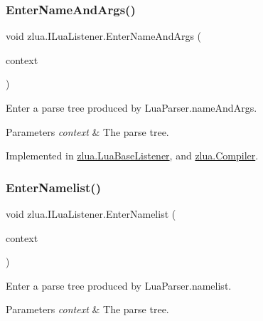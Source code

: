 \subsubsection{\texorpdfstring{Enter\+Name\+And\+Args()}{EnterNameAndArgs()}}
{\footnotesize\ttfamily void zlua.\+I\+Lua\+Listener.\+Enter\+Name\+And\+Args (\begin{DoxyParamCaption}\item[{\mbox{[}\+Not\+Null\mbox{]} \mbox{\hyperlink{classzlua_1_1_lua_parser_1_1_name_and_args_context}{Lua\+Parser.\+Name\+And\+Args\+Context}}}]{context }\end{DoxyParamCaption})}



Enter a parse tree produced by Lua\+Parser.\+name\+And\+Args. 


\begin{DoxyParams}{Parameters}
{\em context} & The parse tree.\\
\hline
\end{DoxyParams}


Implemented in \mbox{\hyperlink{classzlua_1_1_lua_base_listener_a118e7bc8edc07875df5c564171a36084}{zlua.\+Lua\+Base\+Listener}}, and \mbox{\hyperlink{classzlua_1_1_compiler_a84d43624eeeff6bf6b9f229a8880fe0a}{zlua.\+Compiler}}.

\mbox{\label{interfacezlua_1_1_i_lua_listener_ad550fd673f32ad3d88572e1781551e41}} 
\subsubsection{\texorpdfstring{Enter\+Namelist()}{EnterNamelist()}}
{\footnotesize\ttfamily void zlua.\+I\+Lua\+Listener.\+Enter\+Namelist (\begin{DoxyParamCaption}\item[{\mbox{[}\+Not\+Null\mbox{]} \mbox{\hyperlink{classzlua_1_1_lua_parser_1_1_namelist_context}{Lua\+Parser.\+Namelist\+Context}}}]{context }\end{DoxyParamCaption})}



Enter a parse tree produced by Lua\+Parser.\+namelist. 


\begin{DoxyParams}{Parameters}
{\em context} & The parse tree.\\
\hline
\end{DoxyParams}


